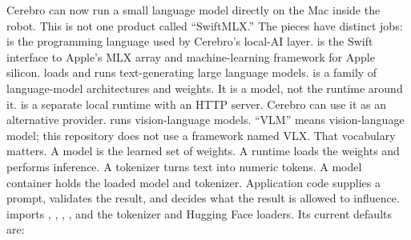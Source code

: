 {}Cerebro can now run a small language model directly on the Mac inside the\markdownRendererSoftLineBreak
{}robot. This is not one product called “SwiftMLX.” The pieces have distinct\markdownRendererSoftLineBreak
{}jobs:\markdownRendererInterblockSeparator
{}\markdownRendererUlBegin
\markdownRendererUlItem {} is the programming language used by Cerebro's local-AI layer.\markdownRendererUlItemEnd 
\markdownRendererUlItem {} is the Swift interface to Apple's MLX array and machine-learning\markdownRendererSoftLineBreak
{}framework for Apple silicon.\markdownRendererUlItemEnd 
\markdownRendererUlItem {} loads and runs text-generating large language models.\markdownRendererUlItemEnd 
\markdownRendererUlItem {} is a family of language-model architectures and weights. It is a\markdownRendererSoftLineBreak
{}model, not the runtime around it.\markdownRendererUlItemEnd 
\markdownRendererUlItem {} is a separate local runtime with an HTTP server. Cerebro can\markdownRendererSoftLineBreak
{}use it as an alternative provider.\markdownRendererUlItemEnd 
\markdownRendererUlItem {} runs vision-language models. “VLM” means vision-language model;\markdownRendererSoftLineBreak
{}this repository does not use a framework named VLX.\markdownRendererUlItemEnd 
\markdownRendererUlEnd \markdownRendererInterblockSeparator
{}That vocabulary matters. A model is the learned set of weights. A runtime\markdownRendererSoftLineBreak
{}loads the weights and performs inference. A tokenizer turns text into numeric\markdownRendererSoftLineBreak
{}tokens. A model container holds the loaded model and tokenizer. Application\markdownRendererSoftLineBreak
{}code supplies a prompt, validates the result, and decides what the result is\markdownRendererSoftLineBreak
{}allowed to influence.\markdownRendererInterblockSeparator
{}\markdownRendererSectionBegin
{}\markdownRendererInterblockSeparator
{} imports , , , , and the\markdownRendererSoftLineBreak
{}tokenizer and Hugging Face loaders. Its current defaults are:\markdownRendererInterblockSeparator
{}\markdownRendererInterblockSeparator
